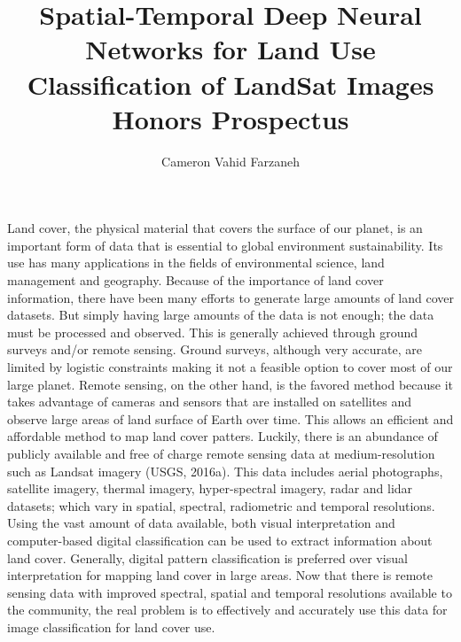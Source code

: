 \documentclass{article}
\begin{document}
	
\author{Cameron Vahid Farzaneh}
\title{Spatial-Temporal Deep Neural Networks for Land Use Classification of LandSat Images\\Honors Prospectus}
\maketitle

Land cover, the physical material that covers the surface of our planet, is an important form of data that is essential to global environment sustainability. Its use has many applications in the fields of environmental science, land management and geography. Because of the importance of land cover information, there have been many efforts to generate large amounts of land cover datasets. But simply having large amounts of the data is not enough; the data must be processed and observed. This is generally achieved through ground surveys and/or remote sensing. Ground surveys, although very accurate, are limited by logistic constraints making it not a feasible option to cover most of our large planet. Remote sensing, on the other hand, is the favored method because it takes advantage of cameras and sensors that are installed on satellites and observe large areas of land surface of Earth over time. This allows an efficient and affordable method to map land cover patters. Luckily, there is an abundance of publicly available and free of charge remote sensing data at medium-resolution such as Landsat imagery (USGS, 2016a). This data includes aerial photographs, satellite imagery, thermal imagery, hyper-spectral imagery, radar and lidar datasets; which vary in spatial, spectral, radiometric and temporal resolutions. Using the vast amount of data available, both visual interpretation and computer-based digital classification can be used to extract information about land cover. Generally, digital pattern classification is preferred over visual interpretation for mapping land cover in large areas. Now that there is remote sensing data with improved spectral, spatial and temporal resolutions available to the community, the real problem is to effectively and accurately use this data for image classification for land cover use. 
\end{document}
